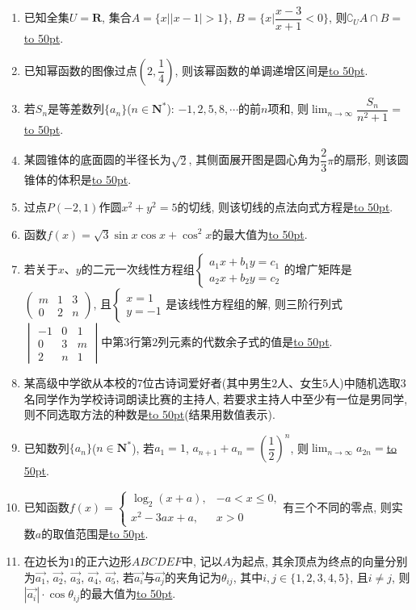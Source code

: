 \documentclass[10pt,a4paper]{article}
\newcommand{\blank}[1]{\underline{\hbox to #1pt{}}}
\begin{document}
\begin{enumerate}[1.]
\item 已知全集$U=\mathbf{R}$, 集合$A=\{x||x-1|>1\}$, $B=\{x|\dfrac{x-3}{x+1}<0\}$, 则$\complement _UA\cap B=$\blank{50}.
\item 已知幂函数的图像过点$(2,\dfrac 14)$, 则该幂函数的单调递增区间是\blank{50}.
\item 若$S_n$是等差数列$\{a_n\}$($n\in \mathbf{N}^*$): $-1,2,5,8,\cdots$的前$n$项和, 则$\displaystyle\lim_{n\to\infty}\dfrac{S_n}{n^2+1}=$\blank{50}.
\item 某圆锥体的底面圆的半径长为$\sqrt 2$, 其侧面展开图是圆心角为$\dfrac 23\pi$的扇形, 则该圆锥体的体积是\blank{50}.
\item 过点$P(-2,1)$作圆$x^2+y^2=5$的切线, 则该切线的点法向式方程是\blank{50}.
\item 函数$f(x)=\sqrt 3\sin x\cos x+\cos ^2x$的最大值为\blank{50}.
\item 若关于$x$、$y$的二元一次线性方程组$\begin{cases} a_1x+b_1y=c_1 \\ a_2x+b_2y=c_2 \end{cases}$的增广矩阵是$\begin{pmatrix}
m & 1 & 3  \\ 0 & 2 & n  \end{pmatrix}$, 且$\begin{cases} x=1 \\ y=-1 \end{cases}$是该线性方程组的解, 则三阶行列式$\begin{vmatrix}
-1 & 0 & 1  \\ 0 & 3 & m  \\ 2 & n & 1  \end{vmatrix}$中第$3$行第$2$列元素的代数余子式的值是\blank{50}.
\item 某高级中学欲从本校的$7$位古诗词爱好者(其中男生$2$人、女生$5$人)中随机选取3名同学作为学校诗词朗读比赛的主持人, 若要求主持人中至少有一位是男同学, 则不同选取方法的种数是\blank{50}(结果用数值表示).
\item 已知数列$\{a_n\}$($n\in \mathbf{N}^*$), 若$a_1=1$, $a_{n+1}+a_n=(\dfrac 12)^n$, 则$\displaystyle \lim_{n\to\infty} a_{2n}=$\blank{50}.
\item 已知函数$f(x)=\begin{cases}  \log_2(x+a), & -a<x\le 0,  \\ x^2-3ax+a, & x>0  \end{cases}$有三个不同的零点, 则实数$a$的取值范围是\blank{50}.
\item 在边长为$1$的正六边形$ABCDEF$中, 记以$A$为起点, 其余顶点为终点的向量分别为$\overrightarrow{a_1}$, $\overrightarrow{a_2}$, $\overrightarrow{a_3}$, $\overrightarrow{a_4}$, $\overrightarrow{a_5}$, 若$\overrightarrow{a_i}$与$\overrightarrow{a_j}$的夹角记为$\theta _{ij}$, 其中$i,j\in \{1,2,3,4,5\}$, 且$i\ne j$, 则$|\overrightarrow{a_i}|\cdot \cos \theta _{ij}$的最大值为\blank{50}.

\end{enumerate}
\end{document}
